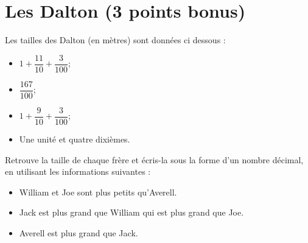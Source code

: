 \section{Les Dalton (3 points bonus)}

Les tailles des Dalton (en mètres) sont données ci dessous :

\begin{itemize}
	\item $1 + \dfrac{11}{10} + \dfrac{3}{100}$;
	\item $\dfrac{167}{100}$;
	\item $1 + \dfrac{9}{10} + \dfrac{3}{100}$;
	\item Une unité et quatre dixièmes.
\end{itemize}

\begin{questions}
	\question[3] Retrouve la taille de chaque frère et écris-la sous la forme d'un nombre décimal, en utilisant les informations suivantes :
	
	\begin{itemize}
		\item William et Joe sont plus petits qu'Averell.
		\item Jack est plus grand que William qui est plus grand que Joe.
		\item Averell est plus grand que Jack.
	\end{itemize}
\end{questions}